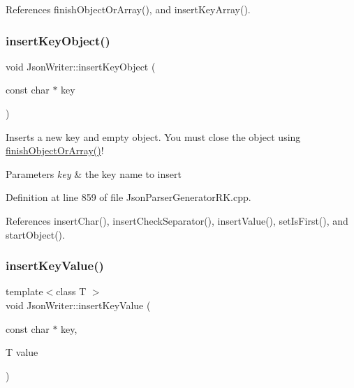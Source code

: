 References finish\+Object\+Or\+Array(), and insert\+Key\+Array().

\mbox{\label{class_json_writer_a338c3e07d0a6a2334da66684c8ae02a3}} 
\subsubsection{\texorpdfstring{insert\+Key\+Object()}{insertKeyObject()}}
{\footnotesize\ttfamily void Json\+Writer\+::insert\+Key\+Object (\begin{DoxyParamCaption}\item[{const char $\ast$}]{key }\end{DoxyParamCaption})}



Inserts a new key and empty object. You must close the object using \hyperlink{class_json_writer_adbd96b46b0679bea3a066c0e62bd86b0}{finish\+Object\+Or\+Array()}! 


\begin{DoxyParams}{Parameters}
{\em key} & the key name to insert \\
\hline
\end{DoxyParams}


Definition at line 859 of file Json\+Parser\+Generator\+R\+K.\+cpp.



References insert\+Char(), insert\+Check\+Separator(), insert\+Value(), set\+Is\+First(), and start\+Object().

\mbox{\label{class_json_writer_ac2de627389b59ce2c8ed95e10ea213bf}} 
\subsubsection{\texorpdfstring{insert\+Key\+Value()}{insertKeyValue()}}
{\footnotesize\ttfamily template$<$class T $>$ \\
void Json\+Writer\+::insert\+Key\+Value (\begin{DoxyParamCaption}\item[{const char $\ast$}]{key,  }\item[{T}]{value }\end{DoxyParamCaption})\hspace{0.3cm}{\ttfamily [inline]}}



